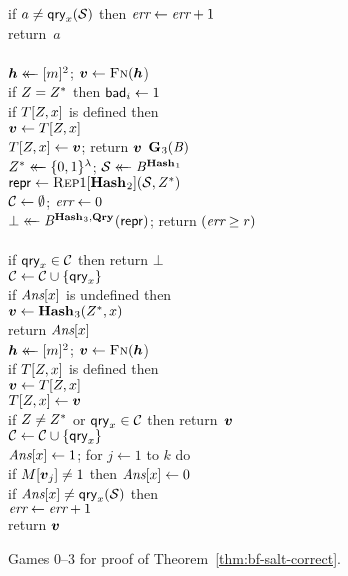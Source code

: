 {\begin{figure*}
{      if $a \neq \qry_x(\col)$ then $\err \gets \err + 1$\\
      return~$a$
    \\[6pt]
    \\[2pt]
      $\hh \getsr [m]^2$; $\vv \gets \fff(\hh$)\\
      if $\salt = \salt^*$ then $\bad_i \gets 1$\\
      if $T[\salt,x]$ is defined then\\
      \tab $\vv \gets T[\salt,x]$\\
      $T[\salt,x] \gets \vv$;
      return $\vv$
  }
  {
    \underline{$\game_3(\advB)$}\\[2pt]
      $\salt^* \getsr \bits^\lambda$;
      $\col \getsr \advB^{\HASHO_1}$\\
      $\pub \gets \Repx[\HASHO_2](\col, \salt^*)$\\
      $\setC \gets \emptyset$;
      $\err \gets 0$\\
      $\bot \getsr \advB^{\HASHO_3,\QRYO}(\pub)$;
      return $(\err \geq r)$
    \\[9pt]
    \\[2pt]
      if $\qry_x \in \setC$ then return $\bot$\\
      $\setC \gets \setC \union \{\qry_x\}$\\
      if $\Ans[x]$ is undefined then\\
      \tab $\vv \gets \HASHO_3(\salt^*,x)$\\
      return $\Ans[x]$
  }
  {
    \\[2pt]
      $\hh \getsr [m]^2$; $\vv \gets \fff(\hh$)\\
      if $T[\salt,x]$ is defined then\\
      \tab $\vv \gets T[\salt,x]$\\
      $T[\salt,x] \gets \vv$\\
      if $\salt \ne \salt^*$ or $\qry_x \in \setC$ then return~$\vv$\\
      $\setC \gets \setC \union \{\qry_x\}$\\
      $\Ans[x] \gets 1$;
      for $j \gets 1$ to $k$ do\\
      \tab\tab if $M[\vv_j] \neq 1$ then $\Ans[x] \gets 0$\\
      if $\Ans[x] \ne \qry_x(\col)$ then\\
      \tab $\err \gets \err + 1$\\
      return $\vv$
  }
  \caption{Games 0--3 for proof of Theorem~\ref{thm:bf-salt-correct}.}
  \label{fig:bf-salt-correct}
\end{figure*}

}
